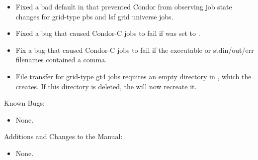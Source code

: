 \begin{itemize}
\item Fixed a bad default in  that prevented
Condor from observing job state changes for grid-type pbs and lsf grid
universe jobs.

\item Fixed a bug that caused Condor-C jobs to fail if
 was set to .

\item Fix a bug that caused Condor-C jobs to fail if the executable
or stdin/out/err filenames contained a comma.

\item File transfer for grid-type gt4 jobs requires an empty directory
in , which the  creates. If this directory
is deleted, the  will now recreate it.

\end{itemize}

\noindent Known Bugs:

\begin{itemize}

\item None.

\end{itemize}

\noindent Additions and Changes to the Manual:

\begin{itemize}

\item None.

\end{itemize}

